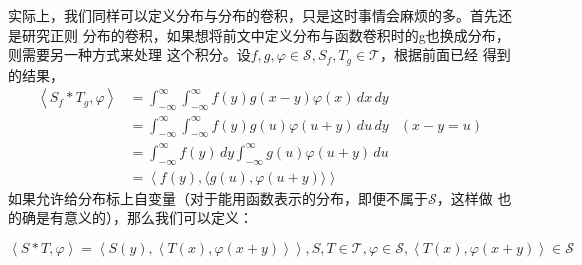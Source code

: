 实际上，我们同样可以定义分布与分布的卷积，只是这时事情会麻烦的多。首先还是研究正则
分布的卷积，如果想将前文中定义分布与函数卷积时的g也换成分布，则需要另一种方式来处理
这个积分。设$f,g,\varphi\in\mathcal{S} ,S_f,T_g\in\mathcal{T} $，根据前面已经
得到的结果，
\begin{align*}
    \left\langle S_f *T_g,\varphi\right\rangle & =\int_{-\infty}^{\infty}\int_{-\infty}^{\infty}f(y)g(x-y)\varphi(x)\,dx\,dy           \\
                                    & =\int_{-\infty}^{\infty}\int_{-\infty}^{\infty}f(y)g(u)\varphi(u+y)\,du\,dy & (x-y=u) \\
                                    & =\int_{-\infty}^{\infty}f(y)\,dy\int_{-\infty}^{\infty}g(u)\varphi(u+y)\,du           \\
                                    & =\left\langle f(y),\langle g(u),\varphi(u+y)\rangle\right\rangle
\end{align*}
如果允许给分布标上自变量（对于能用函数表示的分布，即便不属于$\mathcal{S} $，这样做
也的确是有意义的），那么我们可以定义\cite{brad_osgood_ee261}：
\begin{definition}[分布与分布的卷积]
    \begin{equation*}
    \left\langle S*T,\varphi\right\rangle=\left\langle S(y),\left\langle T(x),\varphi(x+y)\right\rangle\right\rangle,S,T\in\mathcal{T} ,\varphi\in\mathcal{S} ,\left\langle T(x),\varphi(x+y)\right\rangle\in\mathcal{S}
\end{equation*}
\end{definition}

